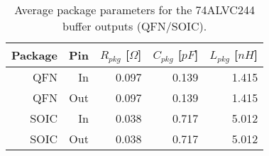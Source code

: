 \documentclass[../main.tex]{subfiles}
\begin{document}
\begin{table}[h]
    \centering
    \begin{tabular}{r|r r r r}
        \toprule[1pt]
        \textbf{Package} & \textbf{Pin} & $R_{pkg}$ [$\si{\Omega}$] & $C_{pkg}$ [$\si{pF}$] & $L_{pkg}$ [$\si{nH}$] \\
        \midrule
        QFN  & In  & 0.097 & 0.139 & 1.415 \\
        QFN  & Out & 0.097 & 0.139 & 1.415 \\
        SOIC & In  & 0.038 & 0.717 & 5.012 \\
        SOIC & Out & 0.038 & 0.717 & 5.012 \\
        \bottomrule[1pt]
    \end{tabular}
    \caption{Average package parameters for the 74ALVC244 buffer outputs (QFN/SOIC).}
    \label{tab:pkg-params}
\end{table}
\end{document}
